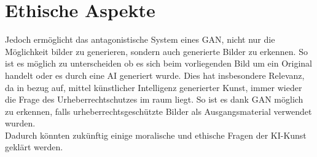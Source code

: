 \section{Ethische Aspekte}

\noindent Jedoch ermöglicht das antagonistische System eines GAN, nicht nur die Möglichkeit bilder zu generieren, sondern auch generierte Bilder zu erkennen. So ist es möglich zu unterscheiden ob es sich beim vorliegenden Bild um ein Original handelt oder es durch eine AI generiert wurde.
Dies hat insbesondere Relevanz, da in bezug auf, mittel künstlicher Intelligenz generierter Kunst, immer wieder die Frage des Urheberrechtschutzes im raum liegt. So ist es dank GAN möglich zu erkennen, falls urheberrechtsgeschützte Bilder als Ausgangsmaterial verwendet wurden. \\

\noindent Dadurch könnten zukünftig einige moralische und ethische Fragen der KI-Kunst geklärt werden.

\newpage
